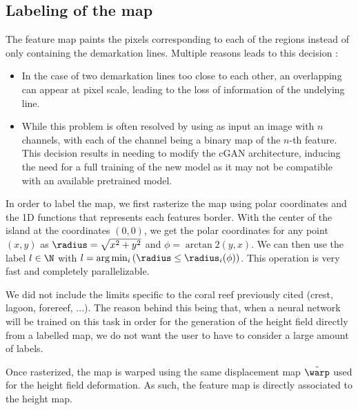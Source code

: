 \subsection{Labeling of the map}
The feature map paints the pixels corresponding to each of the regions instead of only containing the demarkation lines. Multiple reasons leads to this decision :
\begin{itemize}
    \item In the case of two demarkation lines too close to each other, an overlapping can appear at pixel scale, leading to the loss of information of the undelying line.
    \item While this problem is often resolved by using as input an image with $n$ channels, with each of the channel being a binary map of the $n$-th feature. This decision results in needing to modify the cGAN architecture, inducing the need for a full training of the new model as it may not be compatible with an available pretrained model.
\end{itemize}

In order to label the map, we first rasterize the map using polar coordinates and the 1D functions that represents each features border. 
With the center of the island at the coordinates $(0, 0)$, we get the polar coordinates for any point $(x, y)$ as $\radius = \sqrt{x^2 + y^2}$ and $\phi = \arctan2 (y, x)$. We can then use the label $l \in \N$ with $l = \arg \min_i \left( \radius \leq \radius_{i}(\phi) \right)$. This operation is very fast and completely parallelizable.

We did not include the limits specific to the coral reef previously cited (crest, lagoon, forereef, ...). The reason behind this being that, when a neural network will be trained on this task in order for the generation of the height field directly from a labelled map, we do not want the user to have to consider a large amount of labels.

Once rasterized, the map is warped using the same displacement map $\Tilde{\warp}$ used for the height field deformation. As such, the feature map is directly associated to the height map.


